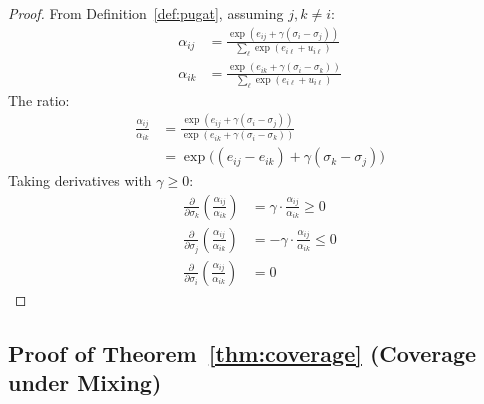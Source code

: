 \documentclass{article}
\theoremstyle{plain}
\theoremstyle{definition}
\theoremstyle{remark}
\begin{document}
\begin{proof}
From Definition~\ref{def:pugat}, assuming $j, k \neq i$:
\begin{align}
\alpha_{ij} &= \frac{\exp(e_{ij} + \gamma(\sigma_i - \sigma_j))}{\sum_{\ell} \exp(e_{i\ell} + u_{i\ell})} \\
\alpha_{ik} &= \frac{\exp(e_{ik} + \gamma(\sigma_i - \sigma_k))}{\sum_{\ell} \exp(e_{i\ell} + u_{i\ell})}
\end{align}
The ratio:
\begin{align}
\frac{\alpha_{ij}}{\alpha_{ik}} &= \frac{\exp(e_{ij} + \gamma(\sigma_i - \sigma_j))}{\exp(e_{ik} + \gamma(\sigma_i - \sigma_k))} \\
&= \exp\big((e_{ij} - e_{ik}) + \gamma(\sigma_k - \sigma_j)\big)
\end{align}
Taking derivatives with $\gamma \geq 0$:
\begin{align}
\frac{\partial}{\partial \sigma_k}\left(\frac{\alpha_{ij}}{\alpha_{ik}}\right) &= \gamma \cdot \frac{\alpha_{ij}}{\alpha_{ik}} \geq 0 \\
\frac{\partial}{\partial \sigma_j}\left(\frac{\alpha_{ij}}{\alpha_{ik}}\right) &= -\gamma \cdot \frac{\alpha_{ij}}{\alpha_{ik}} \leq 0 \\
\frac{\partial}{\partial \sigma_i}\left(\frac{\alpha_{ij}}{\alpha_{ik}}\right) &= 0
\end{align}
\end{proof}

\subsection{Proof of Theorem~\ref{thm:coverage} (Coverage under Mixing)}
\label{app:proof_coverage}
\end{document}
